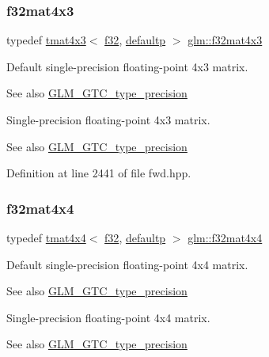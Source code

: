 \subsubsection{\texorpdfstring{f32mat4x3}{f32mat4x3}}
{\footnotesize\ttfamily typedef \mbox{\hyperlink{structglm_1_1tmat4x3}{tmat4x3}}$<$ \mbox{\hyperlink{group__gtc__type__precision_ga0ec999b57f5330d9021256e96038df04}{f32}}, \mbox{\hyperlink{namespaceglm_a0f04f086094c747d227af4425893f545a9d21ccd8b5a009ec7eb7677befc3bf51}{defaultp}} $>$ \mbox{\hyperlink{group__gtc__type__precision_gad68d998fa74028e02bfadd4778bd549a}{glm\+::f32mat4x3}}}

Default single-\/precision floating-\/point 4x3 matrix. \begin{DoxySeeAlso}{See also}
\mbox{\hyperlink{group__gtc__type__precision}{G\+L\+M\+\_\+\+G\+T\+C\+\_\+type\+\_\+precision}}
\end{DoxySeeAlso}
Single-\/precision floating-\/point 4x3 matrix. \begin{DoxySeeAlso}{See also}
\mbox{\hyperlink{group__gtc__type__precision}{G\+L\+M\+\_\+\+G\+T\+C\+\_\+type\+\_\+precision}} 
\end{DoxySeeAlso}


Definition at line 2441 of file fwd.\+hpp.

\mbox{\label{group__gtc__type__precision_gac4a4b2671cbf50ab95c55fce2bfcd811}} 
\subsubsection{\texorpdfstring{f32mat4x4}{f32mat4x4}}
{\footnotesize\ttfamily typedef \mbox{\hyperlink{structglm_1_1tmat4x4}{tmat4x4}}$<$ \mbox{\hyperlink{group__gtc__type__precision_ga0ec999b57f5330d9021256e96038df04}{f32}}, \mbox{\hyperlink{namespaceglm_a0f04f086094c747d227af4425893f545a9d21ccd8b5a009ec7eb7677befc3bf51}{defaultp}} $>$ \mbox{\hyperlink{group__gtc__type__precision_gac4a4b2671cbf50ab95c55fce2bfcd811}{glm\+::f32mat4x4}}}

Default single-\/precision floating-\/point 4x4 matrix. \begin{DoxySeeAlso}{See also}
\mbox{\hyperlink{group__gtc__type__precision}{G\+L\+M\+\_\+\+G\+T\+C\+\_\+type\+\_\+precision}}
\end{DoxySeeAlso}
Single-\/precision floating-\/point 4x4 matrix. \begin{DoxySeeAlso}{See also}
\mbox{\hyperlink{group__gtc__type__precision}{G\+L\+M\+\_\+\+G\+T\+C\+\_\+type\+\_\+precision}} 
\end{DoxySeeAlso}



